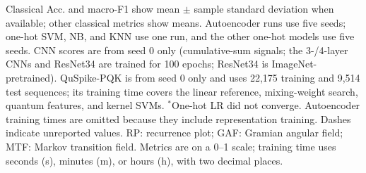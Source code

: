 \documentclass[conference]{IEEEtran}
\begin{document}
\begin{table}[!t]
    \begin{minipage}{\textwidth}
        \footnotesize
        Classical Acc. and macro-F1 show mean $\pm$ sample standard deviation when available; other classical metrics show means. Autoencoder runs use five seeds; one-hot SVM, NB, and KNN use one run, and the other one-hot models use five seeds. CNN scores are from seed 0 only (cumulative-sum signals; the 3-/4-layer CNNs and ResNet34 are trained for 100 epochs; ResNet34 is ImageNet-pretrained). QuSpike-PQK is from seed 0 only and uses 22,175 training and 9,514 test sequences; its training time covers the linear reference, mixing-weight search, quantum features, and kernel SVMs. $^{*}$One-hot LR did not converge. Autoencoder training times are omitted because they include representation training. Dashes indicate unreported values. RP: recurrence plot; GAF: Gramian angular field; MTF: Markov transition field. Metrics are on a 0--1 scale; training time uses seconds (s), minutes (m), or hours (h), with two decimal places.
    \end{minipage}
\end{table}
\end{document}
